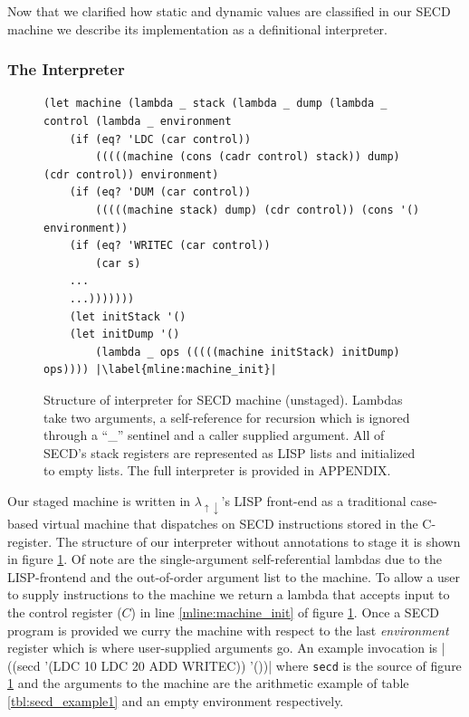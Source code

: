 \documentclass{article}
\theoremstyle{definition}
\newcommand{\mslang}{$\lambda_{\uparrow\downarrow}$}
\begin{document}
Now that we clarified how static and dynamic values are classified in our SECD machine we describe its implementation as a definitional interpreter.


\subsubsection{The Interpreter}\label{subsec:secd_interp}
\begin{figure}[ht]
\centering
\begin{verbatim}
(let machine (lambda _ stack (lambda _ dump (lambda _ control (lambda _ environment
    (if (eq? 'LDC (car control))
        (((((machine (cons (cadr control) stack)) dump) (cdr control)) environment)
    (if (eq? 'DUM (car control))
        (((((machine stack) dump) (cdr control)) (cons '() environment))
    (if (eq? 'WRITEC (car control))
        (car s)
    ...
    ...)))))))
    (let initStack '()
    (let initDump '()
        (lambda _ ops (((((machine initStack) initDump) ops)))) |\label{mline:machine_init}|
\end{verbatim}
\caption{Structure of interpreter for SECD machine (unstaged). Lambdas take two arguments, a self-reference for recursion which is ignored through a ``\_'' sentinel and a caller supplied argument. All of SECD's stack registers are represented as LISP lists and initialized to empty lists. The full interpreter is provided in APPENDIX.}
\label{lst:secd_unstaged}
\end{figure}

Our staged machine is written in \mslang's LISP front-end as a traditional case-based virtual machine that dispatches on SECD instructions stored in the C-register. The structure of our interpreter without annotations to stage it is shown in figure \ref{lst:secd_unstaged}. Of note are the single-argument self-referential lambdas due to the LISP-frontend and the out-of-order argument list to the machine. To allow a user to supply instructions to the machine we return a lambda that accepts input to the control register ($C$) in line \ref{mline:machine_init} of figure \ref{lst:secd_unstaged}. Once a SECD program is provided we curry the machine with respect to the last \textit{environment} register which is where user-supplied arguments go. An example invocation is |((secd '(LDC 10 LDC 20 ADD WRITEC)) '())| where \texttt{secd} is the source of figure \ref{lst:secd_unstaged} and the arguments to the machine are the arithmetic example of table \ref{tbl:secd_example1} and an empty environment respectively.
\end{document}
